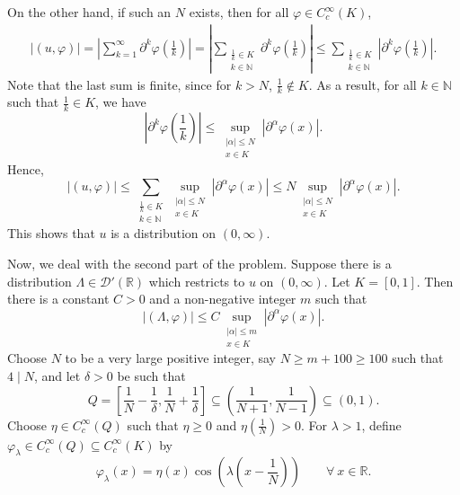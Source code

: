 \documentclass[10pt]{amsart}
\theoremstyle{thmstyle}
\theoremstyle{defstyle}
\newcommand{\R}{\mathbb{R}}
\newcommand{\N}{\mathbb{N}}
\renewcommand{\le}{\leqslant}
\renewcommand{\ge}{\geqslant}
\begin{document}
On the other hand, if such an $N$ exists, then for all $\varphi\in C_c^\infty(K)$, 
\begin{align*}
	\left|(u, \varphi)\right| = \left|\sum_{k = 1}^\infty\partial^k\varphi\left(\frac{1}{k}\right)\right| = \left|\sum_{\substack{\frac{1}{k}\in K\\ k\in\N}}\partial^k\varphi\left(\frac{1}{k}\right)\right|\le\sum_{\substack{\frac{1}{k}\in K\\ k\in\N}}\left|\partial^k\varphi\left(\frac 1k\right)\right|.
\end{align*}
Note that the last sum is finite, since for $k > N$, $\frac{1}{k}\notin K$. As a result, for all $k\in\N$ such that $\frac{1}{k}\in K$, we have 
\begin{equation*}
	\left|\partial^k\varphi\left(\frac{1}{k}\right)\right|\le\sup_{\substack{|\alpha|\le N\\ x\in K}}|\partial^\alpha\varphi(x)|.
\end{equation*}
Hence, 
\begin{equation*}
	|(u, \varphi)|\le\sum_{\substack{\frac{1}{k}\in K\\ k\in\N}}\sup_{\substack{|\alpha|\le N\\ x\in K}}|\partial^\alpha\varphi(x)|\le N\sup_{\substack{|\alpha|\le N\\ x\in K}}|\partial^\alpha\varphi(x)|.
\end{equation*}
This shows that $u$ is a distribution on $(0,\infty)$.

Now, we deal with the second part of the problem. Suppose there is a distribution $\Lambda\in\mathscr D'(\R)$ which restricts to $u$ on $(0,\infty)$. Let $K = [0, 1]$. Then there is a constant $C > 0$ and a non-negative integer $m$ such that 
\begin{equation*}
	|(\Lambda,\varphi)|\le C\sup_{\substack{|\alpha|\le m\\ x\in K}} |\partial^\alpha\varphi(x)|.
\end{equation*}
Choose $N$ to be a very large positive integer, say $N \ge m + 100\ge 100$ such that $4\mid N$, and let $\delta > 0$ be such that 
\begin{equation*}
	Q = \left[\frac{1}{N} - \frac{1}{\delta}, \frac{1}{N} + \frac{1}{\delta}\right]\subseteq\left(\frac{1}{N + 1}, \frac{1}{N - 1}\right)\subseteq(0, 1).
\end{equation*}
Choose $\eta\in C_c^\infty(Q)$ such that $\eta\ge 0$ and $\eta\left(\frac{1}{N}\right) > 0$. For $\lambda > 1$, define $\varphi_\lambda\in C_c^\infty(Q)\subseteq C_c^\infty(K)$ by 
\begin{equation*}
	\varphi_\lambda(x) = \eta(x)\cos\left(\lambda\left(x - \frac{1}{N}\right)\right)\qquad\forall~x\in\R.
\end{equation*}
\end{document}
